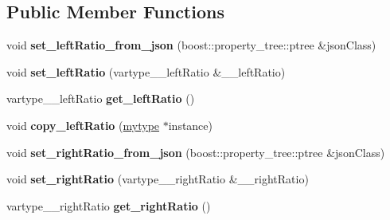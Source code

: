 \subsection*{Public Member Functions}
\begin{DoxyCompactItemize}
\item 
\mbox{\label{classfilter_1_1algos_1_1_i_d_plate_rectifier_af333d7e04ec9f0060221511073c0c0d5}} 
void {\bfseries set\+\_\+left\+Ratio\+\_\+from\+\_\+json} (boost\+::property\+\_\+tree\+::ptree \&json\+Class)
\item 
\mbox{\label{classfilter_1_1algos_1_1_i_d_plate_rectifier_a1391ed78b781f251f40ae126cc6ef64d}} 
void {\bfseries set\+\_\+left\+Ratio} (vartype\+\_\+\+\_\+left\+Ratio \&\+\_\+\+\_\+left\+Ratio)
\item 
\mbox{\label{classfilter_1_1algos_1_1_i_d_plate_rectifier_aa31f83cc13a56ac282e6c6b1be947289}} 
vartype\+\_\+\+\_\+left\+Ratio {\bfseries get\+\_\+left\+Ratio} ()
\item 
\mbox{\label{classfilter_1_1algos_1_1_i_d_plate_rectifier_aafc5b3bf13465090ec2999fe03809391}} 
void {\bfseries copy\+\_\+left\+Ratio} (\hyperlink{classfilter_1_1algos_1_1_i_d_plate_rectifier}{mytype} $\ast$instance)
\item 
\mbox{\label{classfilter_1_1algos_1_1_i_d_plate_rectifier_a60e143e15cd3531ecee93ea5aead970e}} 
void {\bfseries set\+\_\+right\+Ratio\+\_\+from\+\_\+json} (boost\+::property\+\_\+tree\+::ptree \&json\+Class)
\item 
\mbox{\label{classfilter_1_1algos_1_1_i_d_plate_rectifier_ac02baf7a0d43a242c8becb259388096c}} 
void {\bfseries set\+\_\+right\+Ratio} (vartype\+\_\+\+\_\+right\+Ratio \&\+\_\+\+\_\+right\+Ratio)
\item 
\mbox{\label{classfilter_1_1algos_1_1_i_d_plate_rectifier_a53b982db6818e2b0bacd3f7b9625f8ba}} 
vartype\+\_\+\+\_\+right\+Ratio {\bfseries get\+\_\+right\+Ratio} ()
\item 

\end{DoxyCompactItemize}
